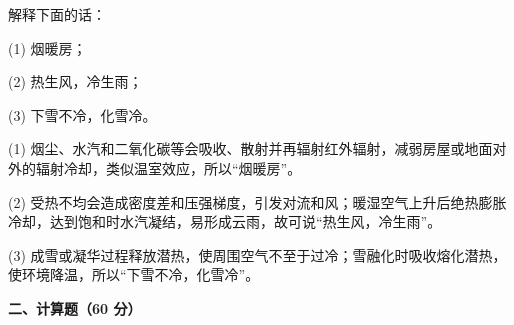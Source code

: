 \begin{question}
解释下面的话：

(1) 烟暖房；

(2) 热生风，冷生雨；

(3) 下雪不冷，化雪冷。
\begin{solution}
(1) 烟尘、水汽和二氧化碳等会吸收、散射并再辐射红外辐射，减弱房屋或地面对外的辐射冷却，类似温室效应，所以“烟暖房”。

(2) 受热不均会造成密度差和压强梯度，引发对流和风；暖湿空气上升后绝热膨胀冷却，达到饱和时水汽凝结，易形成云雨，故可说“热生风，冷生雨”。

(3) 成雪或凝华过程释放潜热，使周围空气不至于过冷；雪融化时吸收熔化潜热，使环境降温，所以“下雪不冷，化雪冷”。
\end{solution}
\end{question}

\textbf{二、计算题（60 分）}

